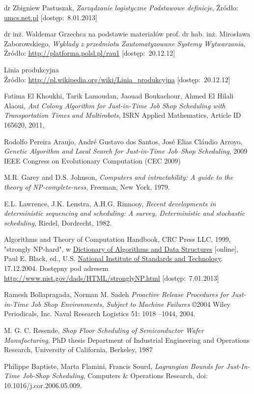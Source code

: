 \documentclass[twoside]{kInzynierka}
\begin{document}
\begin{thebibliography}{10}

dr Zbigniew Pastuszak,
\emph{Zarządzanie logistyczne Podstawowe definicje},
Źródło: \url{umcs.net.pl} [dostęp:~8.01.2013]

dr inż. Waldemar Grzechca na podstawie materiałów prof. dr hab. inż. Mirosława Zaborowskiego,
\emph{Wykłady z przedmiotu Zautomatyzowane Systemy Wytwarzania},
Źródło: \url{http://platforma.polsl.pl/rau1} [dostęp:~20.12.12]

Linia produkcyjna \\
Źródło: \url{http://pl.wikipedia.org/wiki/Linia_produkcyjna} [dostęp:~20.12.12]

Fatima El Khoukhi, Tarik Lamoudan, Jaouad Boukachour, Ahmed El Hilali Alaoui,  
\emph{Ant Colony Algorithm for Just-in-Time Job Shop Scheduling with Transportation Times and Multirobots},
ISRN Applied Mathematics, Article ID 165620, 2011, 

Rodolfo Pereira Araujo, André Gustavo dos Santos, José Elias Cláudio Arroyo,
\emph{Genetic Algorithm and Local Search for Just-in-Time Job–Shop Scheduling},
2009 IEEE Congress on Evolutionary Computation (CEC 2009)

M.R. Garey and D.S. Johnson, 
\emph{Computers and intractability: A guide to the theory of NP-complete-ness},
Freeman, New York, 1979.

E.L. Lawrence, J.K. Lenstra, A.H.G. Rinnooy, 
\emph{Recent developments in deterministic sequencing and scheduling: A survey, Deterministic and stochastic scheduling},
Riedel, Dordrecht, 1982.

Algorithms and Theory of Computation Handbook, CRC Press LLC, 1999, "strongly NP-hard", w \href{http://xlinux.nist.gov/dads/}{Dictionary of Algorithms and Data Structures} [online], Paul E. Black, ed., U.S. \href{http://www.nist.gov/}{National Institute of Standards and Technology}. 17.12.2004. Dostępny pod adresem \url{http://www.nist.gov/dads/HTML/stronglyNP.html} [dostęp:~7.01.2013]

\newpage

Ramesh Bollapragada, Norman M. Sadeh
\emph{Proactive Release Procedures for Just-in-Time Job Shop Environments, Subject to Machine Failures}
\copyright 2004 Wiley Periodicals, Inc. Naval Research Logistics 51: 1018 –1044, 2004.

M. G. C. Resende,  
\emph{Shop Floor Scheduling of Semiconductor Wafer Manufacturing},
PhD thesis Department of Industrial Engineering and Operations Research, University of California, Berkeley, 1987 

Philippe Baptiste, Marta Flamini, Francis Sourd,
\emph{Lagrangian Bounds for Just-In-Time Job-Shop Scheduling},
Computers \& Operations Research, doi: 10.1016/j.cor.2006.05.009.

\end{thebibliography}
\end{document}
